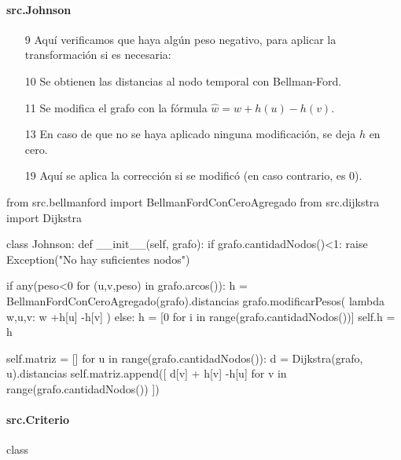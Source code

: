 \documentclass[../tp2_grupo404.tex]{subfiles}
\begin{document}
\paragraph{src.Johnson}

\begin{enumerate}
    \item[9] Aquí verificamos que haya algún peso negativo, para aplicar la transformación si es necesaria:
    \item[10] Se obtienen las distancias al nodo temporal con Bellman-Ford.
    \item[11] Se modifica el grafo con la fórmula $\hat{w} = w + h(u) - h(v)$.
    \item[13] En caso de que no se haya aplicado ninguna modificación, se deja $h$ en cero.
    \item[19] Aquí se aplica la corrección si se modificó (en caso contrario, es 0).
\end{enumerate}

\begin{alternate}[breaklines=true,numbers=left,xleftmargin=5mm]
    from src.bellmanford import BellmanFordConCeroAgregado
    from src.dijkstra import Dijkstra
    
    class Johnson:
        def __init__(self, grafo):
            if grafo.cantidadNodos()<1:
                raise Exception("No hay suficientes nodos")
    
            if any(peso<0 for (u,v,peso) in grafo.arcos()):
                h = BellmanFordConCeroAgregado(grafo).distancias
                grafo.modificarPesos( lambda w,u,v: w +h[u] -h[v] )
            else:
                h = [0 for i in range(grafo.cantidadNodos())]
            self.h = h
            
            self.matriz = []
            for u in range(grafo.cantidadNodos()):
                d = Dijkstra(grafo, u).distancias
                self.matriz.append([ d[v] + h[v] -h[u] for v in range(grafo.cantidadNodos()) ])
\end{alternate}

\paragraph{src.Criterio}

\begin{alternate}[breaklines=true,numbers=left,xleftmargin=5mm]
    class
\end{alternate}

\end{document}
